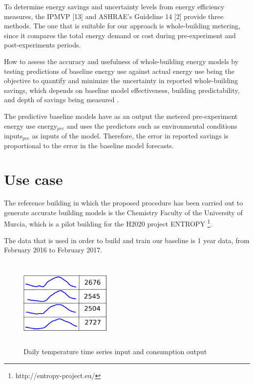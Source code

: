 \documentclass[3p,times,procedia]{elsarticle}
\begin{document}
To determine energy savings and uncertainty levels from energy efficiency measures, the IPMVP [13] and ASHRAE’s Guideline 14 [2] provide three methods. The one that is suitable for our approach is whole-building metering, since it compares the total energy demand or cost during pre-experiment and post-experiments periods.

How to assess the accuracy and usefulness of whole-building energy models by testing predictions of baseline energy use against actual energy use being the objective to quantify and minimize the uncertainty in reported whole-building savings, which depends
on baseline model effectiveness, building predictability, and depth of savings being measured \cite{kramer2013energy}.

The predictive baseline models have as an output the metered pre-experiment energy use energy$_{pre}$ and uses the predictors such as environmental conditions inputs$_{pre}$ as inputs of the model. Therefore, the error in reported savings is proportional to the error in the baseline model forecasts.


\section{Use case}

The reference building in which the proposed procedure has been carried out to generate accurate building models is the Chemistry Faculty of the University of Murcia, which is a pilot building for the H2020 project ENTROPY \footnote{http://entropy-project.eu/}.  

The data that is used in order to build and train our baseline is 1 year data, from February 2016 to February 2017. 

\begin{figure}[h]%
\centering
\centerline{\includegraphics[width=4.5cm,height=4.5cm,keepaspectratio]{./pics/table_inputs_outputs.pdf}}
\caption{Daily temperature time series input and consumption output}\vspace*{-6pt}
  \label{fig:inout}
\end{figure}
\end{document}

